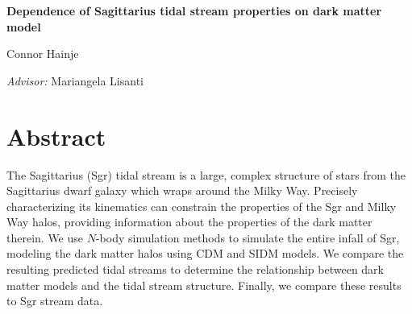\documentclass[12pt]{article}
\begin{document}
{
\centering
\Large \textbf{%
    Dependence of Sagittarius tidal stream properties on dark matter model
} \par
\vspace{10pt}
\normalsize Connor Hainje \par
\vspace{4pt}
\textit{Advisor:} Mariangela Lisanti \par
}


\section*{Abstract}
The Sagittarius (Sgr) tidal stream is a large, complex structure of stars from
the Sagittarius dwarf galaxy which wraps around the Milky Way. Precisely
characterizing its kinematics can constrain the properties of the Sgr and Milky
Way halos, providing information about the properties of the dark matter
therein. We use $N$-body simulation methods to simulate the entire infall of
Sgr, modeling the dark matter halos using CDM and SIDM models. We compare the
resulting predicted tidal streams to determine the relationship between dark
matter models and the tidal stream structure.  Finally, we compare these results
to Sgr stream data.
\end{document}
